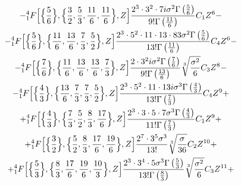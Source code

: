 \begin{multline}
\\

-{^{4}_{1}F} \Bigl[\Bigl\{\frac{5}{6} \Bigr\},\Bigl\{\frac{3}{2},\frac{5}{3}, \frac{11}{6}, \frac{11}{6} \Bigr\},Z\Bigr] \frac{2^3\cdot 3^2\cdot 7i\sigma^2 \Gamma\left(\frac{5}{6}\right)}{9!\Gamma\left(\frac{11}{6}\right)} C_1 Z^6-

\\

-{^{4}_{1}F} \Bigl[\Bigl\{\frac{5}{6} \Bigr\},\Bigl\{\frac{11}{6},\frac{13}{6}, \frac{7}{3}, \frac{5}{2} \Bigr\},Z\Bigr] \frac{2^3\cdot 5^2\cdot 11\cdot 13\cdot 83\sigma^2 \Gamma\left(\frac{5}{6}\right)}{13! \Gamma\left(\frac{11}{6}\right)} C_4 Z^6-

\\ 

-{^{4}_{1}F} \Bigl[\Bigl\{\frac{7}{6} \Bigr\},\Bigl\{\frac{11}{6},\frac{13}{6}, \frac{13}{6}, \frac{7}{3} \Bigr\},Z\Bigr] \frac{2\cdot 3^2i\sigma^2 \Gamma\left(\frac{7}{6}\right)}{9! \Gamma\left(\frac{13}{6}\right)}\sqrt[3]{\frac{\sigma^2}{6}} C_3 Z^8-

\\

-{^{4}_{1}F} \Bigl[\Bigl\{\frac{4}{3} \Bigr\},\Bigl\{\frac{13}{6},\frac{7}{3}, \frac{7}{3}, \frac{5}{2} \Bigr\},Z\Bigr] \frac{2^3\cdot 5^2\cdot 11\cdot 13 i\sigma^3 \Gamma\left(\frac{4}{3}\right)}{13!\Gamma\left(\frac{7}{3}\right)} C_4 Z^9+

\\

+{^{4}_{1}F} \Bigl[\Bigl\{\frac{4}{3} \Bigr\},\Bigl\{\frac{7}{3},\frac{5}{2}, \frac{8}{3}, \frac{17}{6} \Bigr\},Z\Bigr] \frac{2^3\cdot 3\cdot 5\cdot 7\sigma^3 \Gamma\left(\frac{4}{3}\right)}{11! \Gamma\left(\frac{7}{3}\right)} C_1 Z^9+

\\

+{^{4}_{1}F} \Bigl[\Bigl\{\frac{3}{2} \Bigr\},\Bigl\{\frac{5}{2},\frac{8}{3}, \frac{17}{6}, \frac{19}{6} \Bigr\},Z\Bigr] \frac{2^7\cdot 3^5\sigma^3}{13!} \sqrt[3]{\frac{\sigma}{36}} C_2 Z^{10}+

\\

+{^{4}_{1}F} \Bigl[\Bigl\{\frac{5}{3} \Bigr\},\Bigl\{\frac{8}{3},\frac{17}{6}, \frac{19}{6}, \frac{10}{3} \Bigr\},Z\Bigr] \frac{2^3\cdot 3^4\cdot 5\sigma^3 \Gamma\left(\frac{5}{3}\right)} {13! \Gamma\left(\frac{8}{3}\right)} \sqrt[3]{\frac{\sigma^2}{6}} C_3 Z^{11}+

\\


\end{multline}
